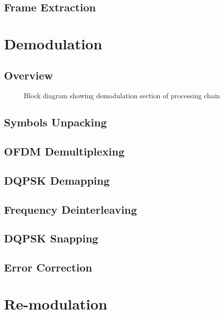 \documentclass[class=report,11pt,crop=false]{standalone}
\begin{document}
\subsection{Frame Extraction \label{subsect:dab-proc_frame-extract}}



\section{Demodulation \label{sect:dab-proc_demodulate}}
\subsection{Overview}

\begin{figure}[htbp]
    \centering
    \def\svgwidth{\linewidth}
    { %
        }
    \caption{Block diagram showing demodulation section of processing chain}
    \label{fig:BD_Demod_All}
\end{figure}


\subsection{Symbols Unpacking \label{subsect:dab-proc_symbols-unpack}}
\subsection{OFDM Demultiplexing \label{subsect:dab-proc_ofdm-demux}}
\subsection{DQPSK Demapping \label{subsect:dab-proc_dqpsk-demap}}
\subsection{Frequency Deinterleaving \label{subsect:dab-proc_freq-deinterleave}}
\subsection{DQPSK Snapping \label{subsect:dab-proc_dqpsk-snap}}
\subsection{Error Correction \label{subsect:dab-proc_error-correct}}

\section{Re-modulation \label{sect:dab-proc_remodulate}}
\end{document}
